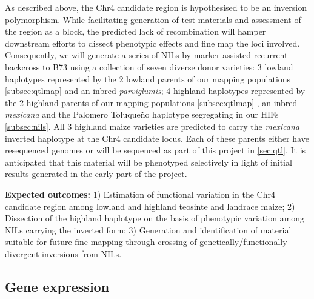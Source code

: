 As described above, the Chr4 candidate region is hypothesised to be an inversion polymorphism. While facilitating generation of test materials and assessment of the region as a block, the predicted lack of recombination will hamper downstream efforts to dissect phenotypic effects and fine map the loci involved. Consequently, we will generate a series of NILs by marker-assisted recurrent backcross to B73 using a collection of seven diverse donor varieties: 3 lowland haplotypes represented by the 2 lowland parents of our mapping populations \ref{subsec:qtlmap} and an inbred \emph{parviglumis}; 4 highland haplotypes represented by the 2 highland parents of our mapping populations \ref{subsec:qtlmap} , an inbred \emph{mexicana} and the Palomero Toluque\~no haplotype segregating in our HIFs \ref{subsec:nils}. All 3 highland maize varieties are predicted to carry the \emph{mexicana} inverted haplotype at the Chr4 candidate locus.  Each of these parents either have resequenced genomes \citep{Vielle-Calzada2009, Chia2012a} or will be sequenced as part of this project in \ref{sec:qtl}. It is anticipated that this material will be phenotyped selectively in light of initial results generated in the early part of the project.

{\bf Expected outcomes:} 1) Estimation of functional variation in the Chr4 candidate region among lowland and highland teosinte and landrace maize; 2) Dissection of the highland haplotype on the basis of phenotypic variation among NILs carrying the inverted form; 3) Generation and identification of material suitable for future fine mapping through crossing of genetically/functionally divergent inversions from NILs.   

\subsection{Gene expression} \label{subsec:rnaseq}

